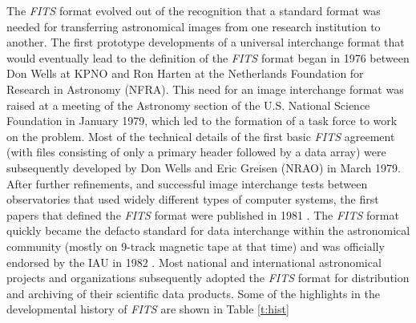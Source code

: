 \documentclass[11pt,makeidx]{book}     %
\begin{document}
  The {\em FITS\/} format evolved out of the
  recognition that a standard format was needed for 
  transferring astronomical images from one research institution to another.  
  The first prototype developments of a universal interchange format that would
  eventually lead to the definition of the {\em FITS\/} format began 
  in 1976 between Don Wells at KPNO and  Ron Harten at the Netherlands 
  Foundation for Research in Astronomy (NFRA).  This need for an image
  interchange format was raised at a meeting of the Astronomy
  section of the U.S. National Science Foundation in January 1979, which led 
  to the formation of a task force to work on the problem.  Most of the
  technical details of the first basic {\em FITS\/} agreement (with files
  consisting of only a primary header followed by a data array) were
  subsequently developed by Don Wells and Eric Greisen (NRAO) in March 1979.
  After further refinements, and successful image interchange tests 
  between observatories that used widely
  different types of computer systems, the first papers that defined the
  {\em FITS\/} format were published in 1981 \cite{wells81, greisen81}.   The {\em FITS\/} format
  quickly became the defacto standard for data interchange 
  within the astronomical community  (mostly on 
  9-track magnetic tape at that time) and  was officially
  endorsed by the IAU  in 1982 \cite{iau83}.  Most national and international
  astronomical projects and organizations subsequently adopted the {\em FITS\/} format
  for distribution and archiving of their scientific data products.
  Some of the highlights in the developmental history of {\em FITS} are shown in Table \ref{t:hist}
\end{document}
